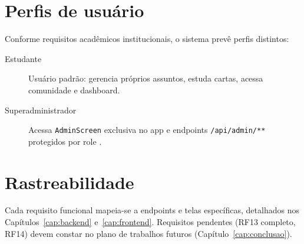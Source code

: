\section{Perfis de usuário}

Conforme requisitos acadêmicos institucionais, o sistema prevê perfis distintos:
\begin{description}
    \item[Estudante] Usuário padrão: gerencia próprios assuntos, estuda cartas, acessa comunidade e dashboard.
    \item[Superadministrador] Acessa \texttt{AdminScreen} exclusiva no app e endpoints \texttt{/api/admin/**} protegidos por role \cite{spring_security_jwt}.
\end{description}

\section{Rastreabilidade}

Cada requisito funcional mapeia-se a endpoints e telas específicas, detalhados nos Capítulos~\ref{cap:backend} e~\ref{cap:frontend}. Requisitos pendentes (RF13 completo, RF14) devem constar no plano de trabalhos futuros (Capítulo~\ref{cap:conclusao}).
